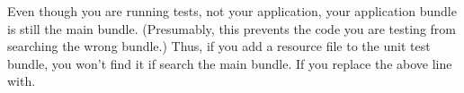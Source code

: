 

Even though you are running tests, not your application, your application bundle is still the main bundle. (Presumably, this prevents the code you are testing from searching the wrong bundle.) Thus, if you add a resource file to the unit test bundle, you won't find it if search the main bundle. If you replace the above line with.
